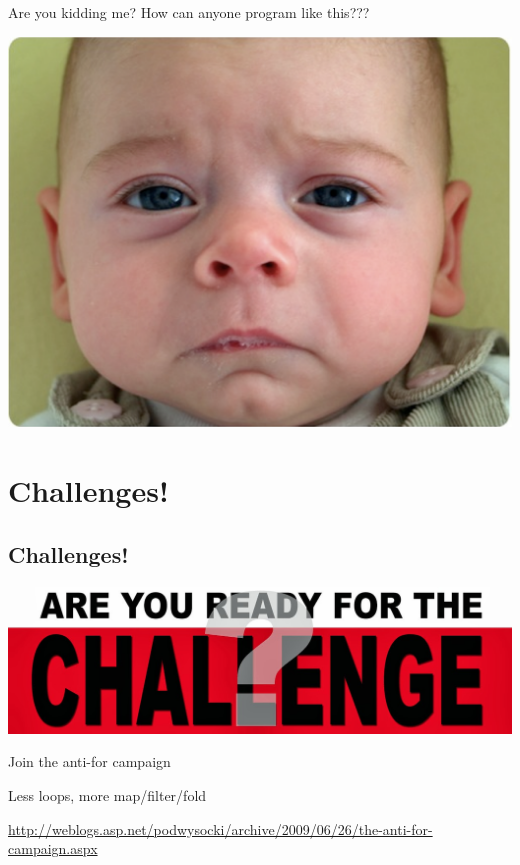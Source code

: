 \documentclass[mathserif]{beamer}
\begin{document}
\begin{frame}{Are you kidding me?}
  How can anyone program like this???
  \begin{center}
    \includegraphics[scale=0.3]{img/sadbaby.png}
  \end{center}
\end{frame}

\section{Challenges!}
\subsection{Challenges!}

\begin{frame}
  \begin{center}
    \includegraphics[scale=0.2]{img/AreYouReadyfortheChallenge.jpg}
  \end{center}
\end{frame}

\begin{frame}{Join the anti-for campaign}

  \begin{center}
    {\Huge Less loops, more map/filter/fold}
  \end{center}
  \vskip5mm
  \url{http://weblogs.asp.net/podwysocki/archive/2009/06/26/the-anti-for-campaign.aspx}
  
\end{frame}
\end{document}
